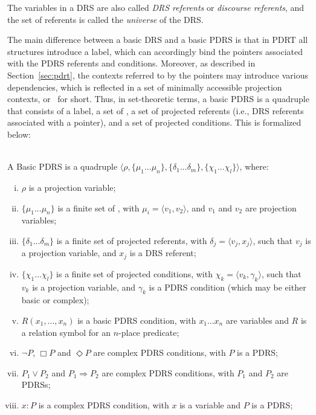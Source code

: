 \noindent The variables in a DRS are also called \textit{DRS referents} or
\textit{discourse referents}, and the set of referents is called the
\textit{universe} of the DRS.

The main difference between a basic DRS and a basic PDRS is that in PDRT all
structures introduce a label, which can accordingly bind the pointers
associated with the PDRS referents and conditions.  Moreover, as described
in Section~\ref{sec:pdrt}, the contexts referred to by the pointers may
introduce various dependencies, which is reflected in a set of minimally
accessible projection contexts, or \MAPs~for short.  Thus, in set-theoretic
terms, a basic PDRS is a quadruple that consists of a label, a set of \MAPs,
a set of projected referents (i.e., DRS referents associated with
a pointer), and a set of projected conditions. This is formalized below:

\begin{definition} \label{def:bPDRS}~\\
A Basic PDRS is a quadruple $\langle \rho, \{\mu_1 ... \mu_n\}, 
\{\delta_1 ... \delta_m\}, \{\chi_1 ... \chi_l\}\rangle$, where:
  \begin{enumerate}[i.]
    \item $\rho$ is a projection variable;
    \item $\{\mu_1 ... \mu_n\}$ is a finite set of \MAPs, with $\mu_i=\langle
      v_1,v_2\rangle$, and  $v_1$ and $v_2$ are projection variables;
    \item $\{\delta_1 ... \delta_m\}$ is a finite set of projected
      referents, with $\delta_j=\langle v_j, x_j\rangle$, such that $v_j$ is
      a projection variable, and $x_j$ is a DRS referent;
    \item $\{\chi_1 ... \chi_l\}$ is a finite set of projected conditions,
      with $\chi_k = \langle v_k,\gamma_k\rangle$, such that $v_k$ is a
      projection variable, and $\gamma_k$ is a PDRS condition (which may be
      either basic or complex);
    \item \label{def:bPDRS:Rel} $R(x_1, ..., x_n)$ is a basic PDRS condition,
      with $x_1 ... x_n$ are variables and $R$ is a relation symbol for an
      $n$-place predicate;
    \item $\neg P$, $\Box P$ and $\Diamond P$ are complex PDRS conditions,
      with $P$ is a PDRS;
    \item $P_1 \vee P_2$ and $P_1 \Rightarrow P_2$ are complex PDRS
      conditions, with $P_1$ and $P_2$ are PDRSs;
    \item\label{def:bPDRS:Prop} $x:P$ is a complex PDRS condition, with $x$
      is a variable and $P$ is a PDRS;
  \end{enumerate}
\end{definition}

